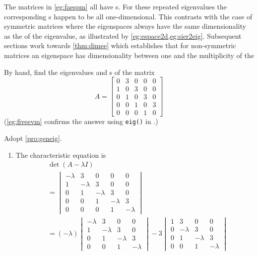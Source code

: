 The matrices in \cref{eg:faespm} all have s.  
For these repeated eigenvalues the corresponding s happen to be all one-dimensional.
This contrasts with the case of symmetric matrices where the 
eigenspaces always have the same dimensionality as the 
 of the eigenvalue, as illustrated by 
\cref{eg:espace2d,eg:sier2eig}.
Subsequent sections work towards \cref{thm:dimee} which establishes that for non-symmetric matrices an eigenspace has dimensionality between one and the multiplicity of the 


\begin{example} \label{eg:fiveev}
By hand, find the eigenvalues and s of the matrix
\begin{equation*}
A=\begin{bmatrix}0&3&0&0&0
\\1&0&3&0&0
\\0&1&0&3&0
\\0&0&1&0&3
\\0&0&0&1&0\end{bmatrix}
\end{equation*}
(\cref{eg:fiveevm} confirms the answer using \verb|eig()| in \script.)
\begin{solution} 
Adopt \cref{pro:geneig}.
\begin{enumerate}
\item The characteristic equation is
\begin{align*}
&\det(A-\lambda I)
\\&=\begin{vmatrix}-\lambda&3&0&0&0
\\1&-\lambda&3&0&0
\\0&1&-\lambda&3&0
\\0&0&1&-\lambda&3
\\0&0&0&1&-\lambda\end{vmatrix}
\\&=(-\lambda)\begin{vmatrix}-\lambda&3&0&0
\\1&-\lambda&3&0
\\0&1&-\lambda&3
\\0&0&1&-\lambda\end{vmatrix}
-3\begin{vmatrix}1&3&0&0
\\0&-\lambda&3&0
\\0&1&-\lambda&3
\\0&0&1&-\lambda\end{vmatrix}

\end{align*}
\end{enumerate}
\end{solution}
\end{example}
